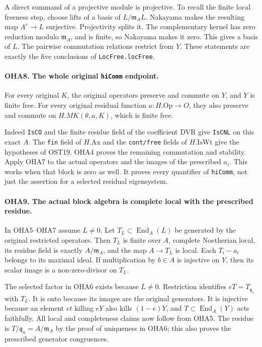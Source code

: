 A direct summand of a projective module is projective. To recall
the finite local freeness step, choose lifts of a basis of
\(L/\mathfrak m_AL\). Nakayama makes the resulting map
\(A^r\to L\) surjective. Projectivity splits it. The complementary
kernel has zero reduction modulo \(\mathfrak m_A\), and is finite,
so Nakayama makes it zero. This gives a basis of \(L\).
The pairwise commutation relations restrict from \(Y\).
These statements are exactly the five conclusions of
\texttt{LocFree.locFree}.

\paragraph{OHA8. The whole original \texttt{hiComm} endpoint.}
\label{claim:OHA8}
For every original \(K\), the original operators preserve and
commute on \(Y\), and \(Y\) is finite free. For every original
residual function \(a:H.\mathrm{Op}\to O\), they also preserve
and commute on \(H.MK(\theta,a,K)\), which is finite free.

Indeed \texttt{IsCO} and the finite residue field of the
coefficient DVR give \texttt{IsCNL} on this exact \(A\).
The \texttt{fin} field of \(H.\mathrm{Ax}\) and the
\texttt{cont/free} fields of \(H.\mathrm{IsWt}\) give the
hypotheses of OST19. OHA4 proves the remaining commutation
and stability. Apply OHA7 to the actual operators and the
images of the prescribed \(a_i\). This works when that block
is zero as well. It proves every quantifier of \texttt{hiComm},
not just the assertion for a selected residual eigensystem.

\paragraph{OHA9. The actual block algebra is complete local with the prescribed residue.}
\label{claim:OHA9}
In OHA5--OHA7 assume \(L\ne0\). Let \(T_L\subset
\operatorname{End}_A(L)\) be generated by the original restricted
operators. Then \(T_L\) is finite over \(A\), complete Noetherian
local, its residue field is exactly \(A/\mathfrak m_A\), and
the map \(A\to T_L\) is local. Each \(T_i-a_i\) belongs to
its maximal ideal. If multiplication by \(b\in A\) is injective
on \(Y\), then its scalar image is a non-zero-divisor on \(T_L\).

The selected factor in OHA6 exists because \(L\ne0\).
Restriction identifies \(eT=T_{\mathfrak q_a}\) with \(T_L\).
It is onto because its images are the original generators.
It is injective because an element \(et\) killing \(eY\)
also kills \((1-e)Y\), and \(T\subset\operatorname{End}_A(Y)\)
acts faithfully. All local and completeness claims now follow
from OHA5. The residue is \(T/\mathfrak q_a=A/\mathfrak m_A\)
by the proof of uniqueness in OHA6; this also proves the
prescribed generator congruences.

